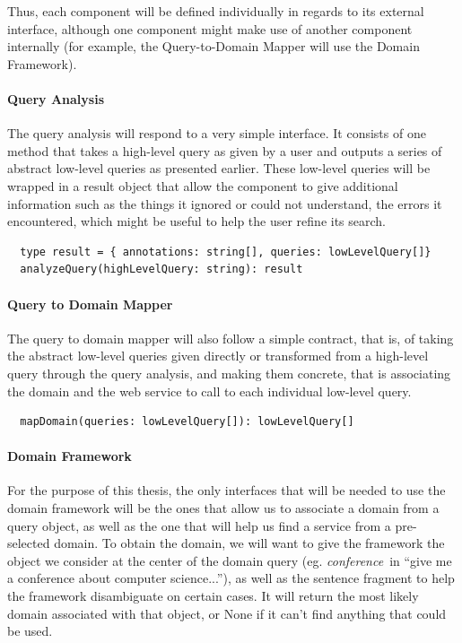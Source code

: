 Thus, each component will be defined individually in regards to its external interface, although one component might make use of another component internally (for example, the Query-to-Domain Mapper will use the Domain Framework).

\paragraph{Query Analysis} %
\label{par:query_analysis_dm}

The query analysis will respond to a very simple interface. It consists of one method that takes a high-level query as given by a user and outputs a series of abstract low-level queries as presented earlier. These low-level queries will be wrapped in a result object that allow the component to give additional information such as the things it ignored or could not understand, the errors it encountered, which might be useful to help the user refine its search.

\begin{verbatim}
  type result = { annotations: string[], queries: lowLevelQuery[]}
  analyzeQuery(highLevelQuery: string): result
\end{verbatim}


\paragraph{Query to Domain Mapper} %
\label{par:query_to_domain_mapper_int}

The query to domain mapper will also follow a simple contract, that is, of taking the abstract low-level queries given directly or transformed from a high-level query through the query analysis, and making them concrete, that is associating the domain and the web service to call to each individual low-level query.

\begin{verbatim}
  mapDomain(queries: lowLevelQuery[]): lowLevelQuery[]
\end{verbatim}


\paragraph{Domain Framework} %
\label{par:domain_framework}

For the purpose of this thesis, the only interfaces that will be needed to use the domain framework will be the ones that allow us to associate a domain from a query object, as well as the one that will help us find a service from a pre-selected domain. To obtain the domain, we will want to give the framework the object we consider at the center of the domain query (eg. \emph{conference}\ in ``give me a conference about computer science...''), as well as the sentence fragment to help the framework disambiguate on certain cases. It will return the most likely domain associated with that object, or None if it can't find anything that could be used.

